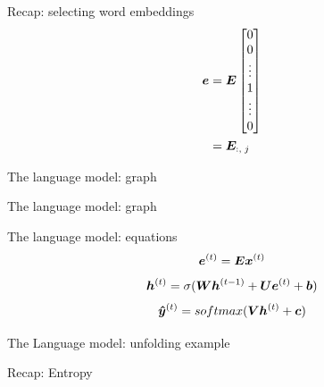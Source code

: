 \documentclass[10pt]{beamer}
\begin{document}
\begin{frame}{Recap: selecting word embeddings}
\Large{
\begin{align*}
  \bm{e} &= \bm{E}   \begin{bmatrix}
                         0\\
                         0\\
                         \vdots \\
                         1\\
                         \vdots \\
                         0
                         \end{bmatrix}\\         
      &= \bm{E}_{:,\;j}
\end{align*}
 }
\end{frame}


\begin{frame}{The language model: graph}

\end{frame}

\begin{frame}{The language model: graph}

\end{frame}



\begin{frame}{The language model: equations}
\Large{
 \vspace{0.2cm}
\begin{equation*}
\bm{e}^{(t)} = \bm{E}\bm{x}^{(t)}
\end{equation*}
\vspace{0.2cm}
 \begin{equation*}
\bm{h}^{(t)} = \sigma(\bm{W}\bm{h}^{(t-1)}+ \bm{U}\bm{e}^{(t)}+ \bm{b})
\end{equation*}
\vspace{0.2cm}
\begin{equation*}
\bm{\hat{y}}^{(t)} = softmax(\bm{V}\bm{h}^{(t)} + \bm{c})
\end{equation*}
}
\end{frame}


\begin{frame}{The Language model: unfolding example}

\end{frame}

\begin{frame}{Recap: Entropy}

\end{frame}
\end{document}

